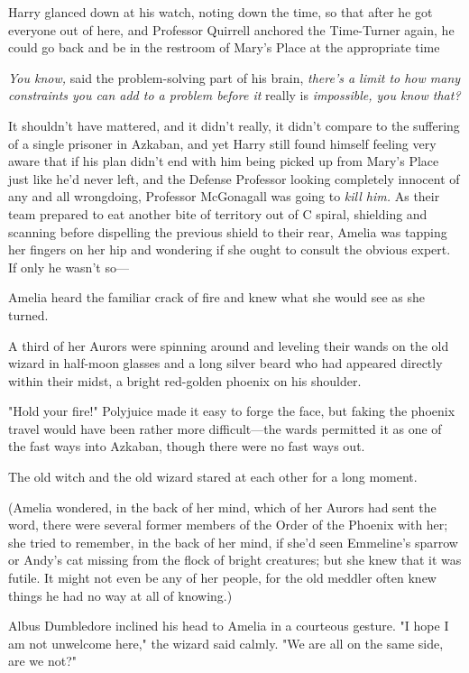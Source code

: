 Harry glanced down at his watch, noting down the time, so that after he got
everyone out of here, and Professor Quirrell anchored the Time-Turner again, he
could go back and be in the restroom of Mary's Place at the appropriate
time{\el}

\emph{You know,} said the problem-solving part of his brain, \emph{there's a
limit to how many constraints you can add to a problem before it} really is
\emph{impossible, you know that?}

It shouldn't have mattered, and it didn't really, it didn't compare to the
suffering of a single prisoner in Azkaban, and yet Harry still found himself
feeling very aware that if his plan didn't end with him being picked up from
Mary's Place just like he'd never left, and the Defense Professor looking
completely innocent of any and all wrongdoing, Professor McGonagall was going
to \emph{kill him.}
\sbreak
As their team prepared to eat another bite of territory out of C spiral,
shielding and scanning before dispelling the previous shield to their rear,
Amelia was tapping her fingers on her hip and wondering if she ought to consult
the obvious expert. If only he wasn't so---

Amelia heard the familiar crack of fire and knew what she would see as she
turned.

A third of her Aurors were spinning around and leveling their wands on the old
wizard in half-moon glasses and a long silver beard who had appeared directly
within their midst, a bright red-golden phoenix on his shoulder.

"Hold your fire!" Polyjuice made it easy to forge the face, but faking the
phoenix travel would have been rather more difficult---the wards permitted it
as one of the fast ways into Azkaban, though there were no fast ways out.

The old witch and the old wizard stared at each other for a long moment.

(Amelia wondered, in the back of her mind, which of her Aurors had sent the
word, there were several former members of the Order of the Phoenix with her;
she tried to remember, in the back of her mind, if she'd seen Emmeline's
sparrow or Andy's cat missing from the flock of bright creatures; but she knew
that it was futile. It might not even be any of her people, for the old meddler
often knew things he had no way at all of knowing.)

Albus Dumbledore inclined his head to Amelia in a courteous gesture. "I hope I
am not unwelcome here," the wizard said calmly. "We are all on the same side,
are we not?"

